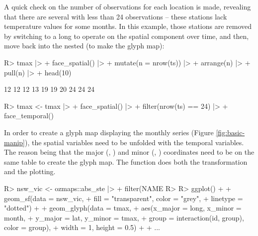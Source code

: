 \documentclass[
  shortnames]{jss}
\begin{document}
A quick check on the number of observations for each location is made, revealing that there are several with less than 24 observations -- these stations lack temperature values for some months. In this example, those stations are removed by switching to a long  to operate on the spatial component over time, and then, move back into the nested  (to make the glyph map):

\begin{CodeChunk}
\begin{CodeInput}
R> tmax |> 
+   face_spatial() |> 
+   mutate(n = nrow(ts)) |>
+   arrange(n) |>
+   pull(n) |> 
+   head(10)
\end{CodeInput}
\begin{CodeOutput}
 [1] 12 12 12 13 19 19 20 24 24 24
\end{CodeOutput}
\begin{CodeInput}
R> tmax <- tmax |> 
+   face_spatial() |> 
+   filter(nrow(ts) == 24) |>
+   face_temporal()
\end{CodeInput}
\end{CodeChunk}

In order to create a glyph map displaying the monthly series (Figure \ref{fig:basic-manip}), the spatial variables need to be unfolded with the temporal variables. The reason being that the major (, ) and minor (, ) coordinates need to be on the same table to create the glyph map. The  function does both the transformation and the plotting.

\begin{CodeChunk}
\begin{CodeInput}
R> nsw_vic <- ozmaps::abs_ste |>
+   filter(NAME %
R> 
R> ggplot() +
+   geom_sf(data = nsw_vic,
+           fill = "transparent", color = "grey",
+           linetype = "dotted") +
+   geom_glyph(data = tmax,
+              aes(x_major = long, x_minor = month,
+                  y_major = lat, y_minor = tmax,
+                  group = interaction(id, group), color = group),
+              width = 1, height = 0.5) +
+   ...
\end{CodeInput}
\end{CodeChunk}
\end{document}
